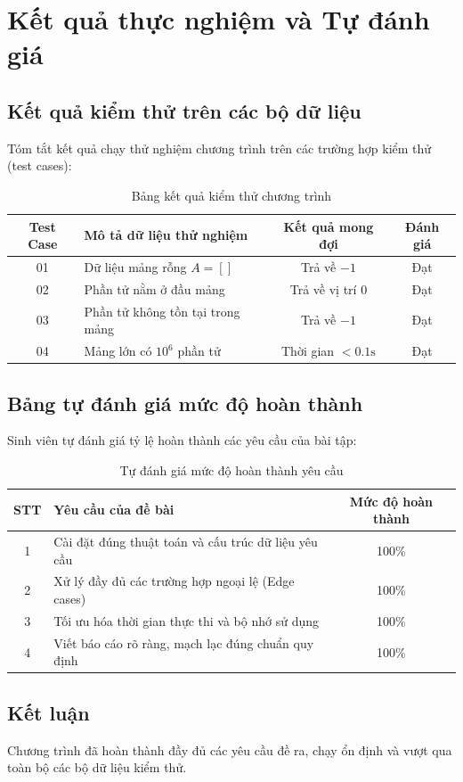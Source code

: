 \section{Kết quả thực nghiệm và Tự đánh giá}

\subsection{Kết quả kiểm thử trên các bộ dữ liệu}
Tóm tắt kết quả chạy thử nghiệm chương trình trên các trường hợp kiểm thử (test cases):

\begin{table}[h!]
    \centering
    \caption{Bảng kết quả kiểm thử chương trình}
    \label{tab:test_results}
    \begin{tabularx}{\textwidth}{c X c c}
        \toprule
        \textbf{Test Case} & \textbf{Mô tả dữ liệu thử nghiệm} & \textbf{Kết quả mong đợi} & \textbf{Đánh giá} \\
        \midrule
        01 & Dữ liệu mảng rỗng $A = []$ & Trả về $-1$ & Đạt \\
        02 & Phần tử nằm ở đầu mảng & Trả về vị trí $0$ & Đạt \\
        03 & Phần tử không tồn tại trong mảng & Trả về $-1$ & Đạt \\
        04 & Mảng lớn có $10^6$ phần tử & Thời gian $< 0.1\text{s}$ & Đạt \\
        \bottomrule
    \end{tabularx}
\end{table}

\subsection{Bảng tự đánh giá mức độ hoàn thành}
Sinh viên tự đánh giá tỷ lệ hoàn thành các yêu cầu của bài tập:

\begin{table}[h!]
    \centering
    \caption{Tự đánh giá mức độ hoàn thành yêu cầu}
    \label{tab:self_eval}
    \begin{tabularx}{\textwidth}{c X c}
        \toprule
        \textbf{STT} & \textbf{Yêu cầu của đề bài} & \textbf{Mức độ hoàn thành} \\
        \midrule
        1 & Cài đặt đúng thuật toán và cấu trúc dữ liệu yêu cầu & 100\% \\
        2 & Xử lý đầy đủ các trường hợp ngoại lệ (Edge cases) & 100\% \\
        3 & Tối ưu hóa thời gian thực thi và bộ nhớ sử dụng & 100\% \\
        4 & Viết báo cáo rõ ràng, mạch lạc đúng chuẩn quy định & 100\% \\
        \bottomrule
    \end{tabularx}
\end{table}

\subsection{Kết luận}
Chương trình đã hoàn thành đầy đủ các yêu cầu đề ra, chạy ổn định và vượt qua toàn bộ các bộ dữ liệu kiểm thử.
